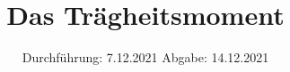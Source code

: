 

\subject{Versuch V101}
\title{Das Trägheitsmoment}
\date{
  Durchführung: 7.12.2021
  \hspace{3em}
  Abgabe: 14.12.2021
}



\maketitle
\thispagestyle{empty}
\tableofcontents
\newpage








\printbibliography{}


